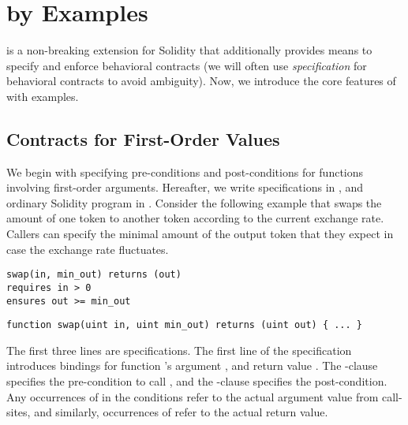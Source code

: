 \section{\lang by Examples} \label{sec:examples}

\lang is a non-breaking extension for Solidity that additionally provides means
to specify and enforce behavioral contracts (we will often use \emph{specification} 
for behavioral contracts to avoid ambiguity).
Now, we introduce the core features of \lang with examples.

\subsection{Contracts for First-Order Values}

We begin with specifying pre-conditions and post-conditions for functions
involving first-order arguments. 
Hereafter, we write \lang specifications in {}, 
and ordinary Solidity program in .
Consider the following  example that swaps the amount  of one token to another token according to the current exchange rate. 
Callers can specify the minimal amount  of the output token that they expect in case the exchange rate fluctuates.

\begin{lstlisting}[language=Consol]
swap(in, min_out) returns (out)
requires in > 0
ensures out >= min_out
\end{lstlisting}
\vspace{-0.25em}
\begin{lstlisting}[language=Solidity]
function swap(uint in, uint min_out) returns (uint out) { ... }
\end{lstlisting}

The first three lines are \lang specifications.
The first line of the specification introduces bindings for function 's 
argument ,  and return value .
The -clause specifies the pre-condition to call ,
and the -clause specifies the post-condition.
Any occurrences of  in the conditions refer to the actual
argument value from call-sites, and similarly, occurrences of 
refer to the actual return value.

